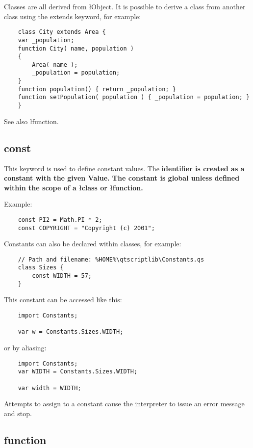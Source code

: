 \documentclass[11pt,a4paper]{book}
\renewcommand{\c}{\sf}
\begin{document}
{{{{{{Classes are all derived from \l Object. It is possible to derive a
class from another class using the \c extends keyword, for example:
\begin{verbatim}
    class City extends Area {
	var _population;
	function City( name, population )
	{
	    Area( name );
	    _population = population;
	}
	function population() { return _population; }
	function setPopulation( population ) { _population = population; }
    }
\end{verbatim}

See also \l function.

\subsection{const}

\c{const identifier = Value;}

This keyword is used to define constant values. The \bf identifier is
created as a constant with the given \bf Value. The constant is global
unless defined within the scope of a \l class or \l function.

Example:
\begin{verbatim}
    const PI2 = Math.PI * 2;
    const COPYRIGHT = "Copyright (c) 2001";
\end{verbatim}

    Constants can also be declared within classes, for example:
    \begin{verbatim}
	// Path and filename: %HOME%\qtscriptlib\Constants.qs
	class Sizes {
	    const WIDTH = 57;
	}
    \end{verbatim}


    This constant can be accessed like this:
    \begin{verbatim}
	import Constants;

	var w = Constants.Sizes.WIDTH;
    \end{verbatim}
    or by aliasing:
    \begin{verbatim}
	import Constants;
	var WIDTH = Constants.Sizes.WIDTH;

	var width = WIDTH;
    \end{verbatim}

Attempts to assign to a constant cause the interpreter to issue an
error message and stop.

\subsection{function}

}}}}}}
\end{document}
